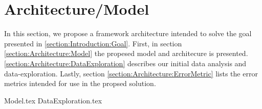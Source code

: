 \chapter{Architecture/Model}
\label{section:Architecture}

In this section, we propose a framework architecture intended to solve the goal presented in \autoref{section:Introduction:Goal}.
First, in section \ref{section:Architecture:Model} the propesed model and architecure is presented.
\autoref{section:Architecture:DataExploration} describes our initial data analysis and data-exploration.
Lastly, section \ref{section:Architecture:ErrorMetric} lists the error metrics intended for use in the propsed solution.

{Model.tex}
{DataExploration.tex}


\iffalse
  Here you will present the architecture or model that you have chosen, and that is (or will be) implemented in your work. Note that putting algorithms in your report is not desirable but in certain cases these might be placed in the appendix. Code further be avoided in the report itself but may be delivered in the fashion requested by the supervisor or, in the case of masters delivery, submitted as additional documents.
\fi
